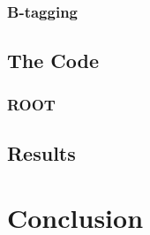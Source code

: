 \documentclass[11pt,a4paper]{article}
\begin{document}
\subsubsection{B-tagging}

\subsection{The Code}

\subsubsection{ROOT}

\subsection{Results}

\section{Conclusion}

\printbibliography
\end{document}
